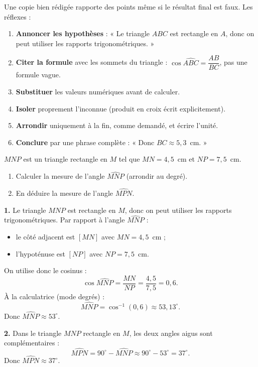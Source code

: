 \documentclass[11pt]{article}
\begin{document}
\begin{methode}
Une copie bien rédigée rapporte des points même si le résultat final est faux. Les réflexes :
\begin{enumerate}
\item \textbf{Annoncer les hypothèses} : « Le triangle $ABC$ est rectangle en $A$, donc on peut utiliser les rapports trigonométriques. »
\item \textbf{Citer la formule} avec les sommets du triangle : $\cos \widehat{ABC} = \dfrac{AB}{BC}$, pas une formule vague.
\item \textbf{Substituer} les valeurs numériques avant de calculer.
\item \textbf{Isoler} proprement l'inconnue (produit en croix écrit explicitement).
\item \textbf{Arrondir} uniquement à la fin, comme demandé, et écrire l'unité.
\item \textbf{Conclure} par une phrase complète : « Donc $BC \approx 5{,}3$~cm. »
\end{enumerate}
\end{methode}

\begin{exoresolu}
$MNP$ est un triangle rectangle en $M$ tel que $MN = 4{,}5$~cm et $NP = 7{,}5$~cm.
\begin{enumerate}
\item Calculer la mesure de l'angle $\widehat{MNP}$ (arrondir au degré).
\item En déduire la mesure de l'angle $\widehat{MPN}$.
\end{enumerate}
\tcblower
\textbf{1.} Le triangle $MNP$ est rectangle en $M$, donc on peut utiliser les rapports trigonométriques.
Par rapport à l'angle $\widehat{MNP}$ :
\begin{itemize}
\item le côté adjacent est $[MN]$ avec $MN = 4{,}5$~cm ;
\item l'hypoténuse est $[NP]$ avec $NP = 7{,}5$~cm.
\end{itemize}
On utilise donc le cosinus :
\[ \cos \widehat{MNP} = \dfrac{MN}{NP} = \dfrac{4{,}5}{7{,}5} = 0{,}6. \]
À la calculatrice (mode degrés) :
\[ \widehat{MNP} = \cos^{-1}(0{,}6) \approx 53{,}13^{\circ}. \]
Donc $\boxed{\widehat{MNP} \approx 53^{\circ}}$.

\textbf{2.} Dans le triangle $MNP$ rectangle en $M$, les deux angles aigus sont complémentaires :
\[ \widehat{MPN} = 90^{\circ} - \widehat{MNP} \approx 90^{\circ} - 53^{\circ} = 37^{\circ}. \]
Donc $\boxed{\widehat{MPN} \approx 37^{\circ}}$.
\end{exoresolu}
\end{document}
